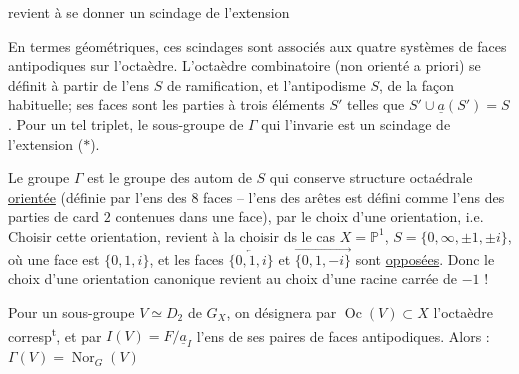 revient à se donner un scindage de l'extension

En termes géométriques, ces scindages sont associés aux quatre systèmes de  faces antipodiques sur l'octaèdre.  L'octaèdre combinatoire (non orienté a priori) se définit à partir de l'ens $S$ de ramification, et l'antipodisme  $S$, de la façon habituelle; ses faces sont les parties à trois éléments  $S'$ telles que $S'\cup\underline a(S')=S$. Pour un tel triplet, le sous-groupe de $\Gamma$ qui l'invarie est un scindage de l'extension ($*$).

Le groupe $\Gamma$ est le groupe des autom de $S$ qui conserve  structure octaédrale \uline{orientée} (définie par l'ens  des $8$ faces  -- l'ens des arêtes  est défini comme l'ens des parties de card $2$ contenues dans une face), par le choix d'une orientation, i.e. Choisir cette orientation, revient  à la choisir ds le cas  $X=\mathbb P^1$, $S=\{0,\infty,\pm1,\pm i\}$, où une face est $\{0,1,i\}$, et les faces  $\overleftarrow{\{0,1,i\}}$ et $\overrightarrow{\{0,1,-i\}}$ sont \uline{opposées}. Donc le choix d'une orientation canonique revient au choix d'une racine carrée de $-1$ !

Pour un sous-groupe $V\simeq D_2$ de $G_X$, on désignera par $\operatorname{Oc}(V)\subset X$ l'octaèdre corresp\textsuperscript{t}, et par $I(V)=F/\underline a_I$ l'ens de ses paires de faces antipodiques. Alors : $\Gamma(V)=\operatorname{Nor}_{G}(V)$
